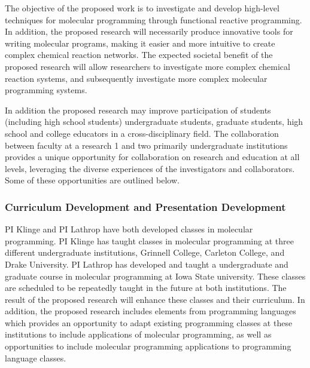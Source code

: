 

The objective of the proposed work is to investigate and develop high-level techniques for molecular programming through functional reactive programming.
In addition, the proposed research will necessarily produce innovative tools for writing molecular programs, making it easier and more intuitive to create complex chemical reaction networks.
The expected societal benefit of the proposed research will allow researchers to investigate more complex chemical reaction systems, and subsequently investigate more complex molecular programming systems.



In addition the proposed research may improve participation of students (including high school students) undergraduate students, graduate students, high school and college educators in a cross-disciplinary field.
The collaboration between faculty at a research 1 and two primarily undergraduate institutions provides a unique opportunity for collaboration on research and education at all levels, leveraging the diverse experiences of the investigators and collaborators.
Some of these opportunities are outlined below.  
\subsubsection*{Curriculum Development and Presentation Development}
PI Klinge and PI Lathrop have both developed classes in molecular programming. PI Klinge has taught classes in molecular programming at three different undergraduate institutions, Grinnell College, Carleton College, and Drake University.
PI Lathrop has developed and taught a undergraduate and graduate course in molecular programming at Iowa State university.
These classes are scheduled to be repeatedly taught in the future at both institutions.
The result of the proposed research will enhance these classes and their curriculum.
In addition, the proposed research includes elements from programming languages which provides an opportunity to adapt existing programming classes at these institutions to include applications of molecular programming, as well as opportunities to include molecular programming applications to programming language classes.

